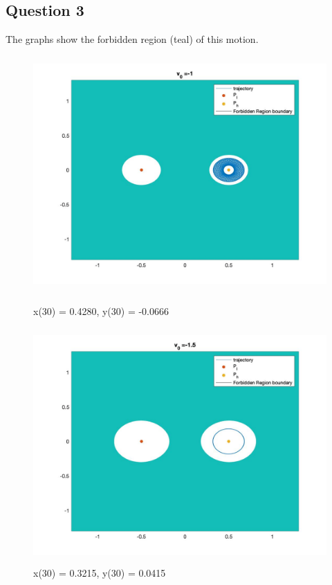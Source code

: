 \documentclass[11pt]{article}
\begin{document}
\subsection{Question 3}
The graphs show the forbidden region (teal) of this motion. 
\newpage
\begin{figure}[H]
\includegraphics[width = 12cm, height =9cm]{Q3(1).jpg}
\caption{x(30) = 0.4280,  y(30) = -0.0666 }
\includegraphics[width = 12cm, height = 9cm]{Q3(2).jpg}
\caption{x(30) = 0.3215,  y(30) = 0.0415}
\end{figure}
\end{document}
